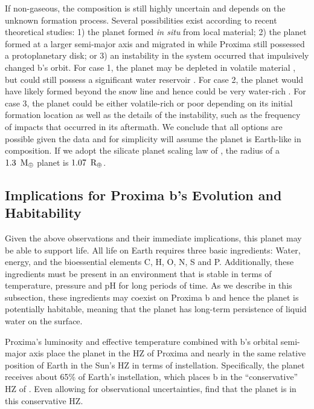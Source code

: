 \documentclass[preprint,12pt]{aastex}
\def\mearth{{\rm\,M_\oplus}}
\def\rearth{{\rm\,R_\oplus}}
\begin{document}
If non-gaseous, the composition is still highly uncertain and depends
on the unknown formation process. Several possibilities exist
according to recent theoretical studies: 1) the planet formed {\it in
  situ} from local material; 2) the planet formed at a larger
semi-major axis and migrated in while Proxima still possessed a
protoplanetary disk; or 3) an instability in the system occurred that
impulsively changed b's orbit. For case 1, the planet may be depleted
in volatile material \citep{Raymond07,Lissauer07}, but could still
possess a significant water reservoir \citep{Ciesla15,Mulders15}. For case 2,
the planet would have likely formed beyond the snow line and hence
could be very water-rich \citep{CarterBond12}. For case 3, the planet
could be either volatile-rich or poor depending on its initial
formation location as well as the details of the instability, such as
the frequency of impacts that occurred in its aftermath. We conclude
that all options are possible given the data and for simplicity will
assume the planet is Earth-like in composition. If we adopt the
silicate planet scaling law of \cite{Sotin07}, the radius of a
$1.3~\mearth$ planet is $1.07~\rearth$.

\subsection{Implications for Proxima b's Evolution and Habitability}
\label{sec:obs:imp}

Given the above observations and their immediate implications, this
planet may be able to support life. All life on Earth requires three
basic ingredients: Water, energy, and the bioessential elements C, H,
O, N, S and P. Additionally, these ingredients must be present in an
environment that is stable in terms of temperature, pressure and pH
for long periods of time. As we describe in this subsection, these
ingredients may coexist on Proxima b and hence the planet is
potentially habitable, meaning that the planet has long-term persistence
of liquid water on the surface.

Proxima's luminosity and effective temperature combined with b's
orbital semi-major axis place the planet in the HZ of
Proxima and nearly in the same relative position of Earth in the Sun's
HZ in terms of instellation. Specifically, the planet receives about 65\% of Earth's
instellation, which places b in the ``conservative'' HZ of 
\cite{Kopparapu13}. Even allowing for observational uncertainties, 
\cite{AngladaEscude16} find that the planet is in this
conservative HZ. 
\end{document}

